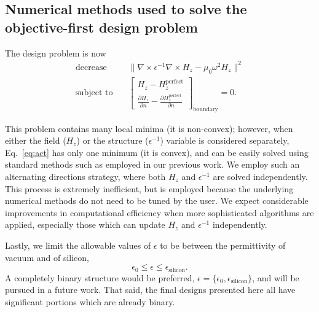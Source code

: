 \documentclass[letterpaper,10pt]{article}
\begin{document}
\subsection{Numerical methods used to solve the objective-first design problem}
The design problem is now
    \begin{subequations}\label{eq:act}
    \begin{align} 
    \text{decrease} & \quad  
        \| \nabla \times \epsilon^{-1} \nabla \times H_z - 
            \mu_0 \omega^2 H_z \|^2 \label{eq:act:obj} \\ 
    \text{subject to} & \quad 
        \begin{bmatrix}
        H_z - H_z^\text{perfect} \\
        \frac{\partial H_z}{\partial n} - 
            \frac{\partial H_z^\text{perfect}}{\partial n}
        \end{bmatrix}_\text{boundary}
        = 0.
    \end{align}
    \end{subequations}

This problem contains many local minima (it is non-convex\cite{boydbook});
    however, when either the field ($H_z$) or the structure ($\epsilon^{-1}$)
    variable is considered separately, Eq.~\ref{eq:act} has only one minimum
    (it is convex), and can be easily solved using standard methods
    such as employed in our previous work\cite{prevwork}.
We employ such an alternating directions strategy,
    where both $H_z$ and $\epsilon^{-1}$ are solved independently.
This process is extremely inefficient,
    but is employed because the underlying numerical methods
    do not need to be tuned by the user.
We expect considerable improvements in computational efficiency
    when more sophisticated algorithms are applied,
    especially those which can update $H_z$ and $\epsilon^{-1}$ independently.
    
Lastly, we limit the allowable values of $\epsilon$ to be between
    the permittivity of vacuum and of silicon,
    \begin{equation}
    \epsilon_0 \le \epsilon \le \epsilon_\text{silicon}.
    \end{equation}
A completely binary structure would be preferred,
    $\epsilon = \{\epsilon_0, \epsilon_\text{silicon}\}$,
    and will be pursued in a future work.
That said, the final designs presented here 
    all have significant portions which are already binary.
\end{document}

